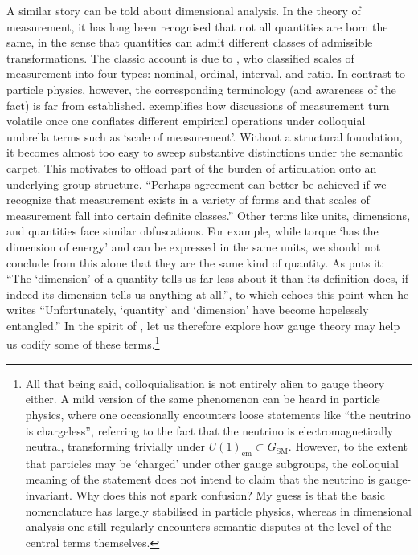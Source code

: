 \documentclass[12pt]{article}
\numberwithin{equation}{section}
\begin{document}
A similar story can be told about dimensional analysis. In the theory of measurement, it has long been recognised that not all quantities are born the same, in the sense that quantities can admit different classes of admissible transformations. The classic account is due to \citet{Stevens1946}, who classified scales of measurement into four types: nominal, ordinal, interval, and ratio. In contrast to particle physics, however, the corresponding terminology (and awareness of the fact) is far from established. \citeauthor{Stevens1946} exemplifies how discussions of measurement turn volatile once one conflates different empirical operations under colloquial umbrella terms such as `scale of measurement'. Without a structural foundation, it becomes almost too easy to sweep substantive distinctions under the semantic carpet. This motivates \citeauthor{Stevens1946} to offload part of the burden of articulation onto an underlying group structure. ``Perhaps agreement can better be achieved if we recognize that measurement exists in a variety of forms and that scales of measurement fall into certain definite classes.'' \citep[p.~677]{Stevens1946} Other terms like units, dimensions, and quantities face similar obfuscations. For example, while torque `has the dimension of energy' and can be expressed in the same units, we should not conclude from this alone that they are the same kind of quantity. As \citet[p.~L22]{Emerson2005} puts it: ``The `dimension' of a quantity tells us far less about it than its definition does, if indeed its dimension tells us anything at all.'', to which \citet[p.~120]{Hall2022} echoes this point when he writes ``Unfortunately, `quantity' and `dimension' have become hopelessly entangled.'' In the spirit of \citeauthor{Stevens1946}, let us therefore explore how gauge theory may help us codify some of these terms.\footnote{\label{footnote:gaugeinvariant}All that being said, colloquialisation is not entirely alien to gauge theory either. A mild version of the same phenomenon can be heard in particle physics, where one occasionally encounters loose statements like ``the neutrino is chargeless'', referring to the fact that the neutrino is electromagnetically neutral, transforming trivially under $U(1)_\text{em}\subset G_\text{SM}$. However, to the extent that particles may be `charged' under other gauge subgroups, the colloquial meaning of the statement does not intend to claim that the neutrino is gauge-invariant. Why does this not spark confusion? My guess is that the basic nomenclature has largely stabilised in particle physics, whereas in dimensional analysis one still regularly encounters semantic disputes at the level of the central terms themselves.}
\end{document}
